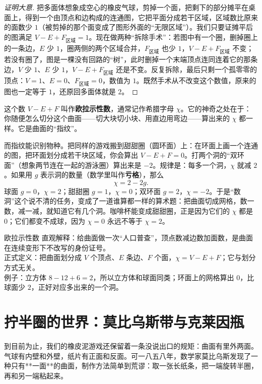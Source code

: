 \begin{proof}[证明大意]
把多面体想象成空心的橡皮气球，剪掉一个面，把剩下的部分摊平在桌面上，得到一个由顶点和边构成的连通图，它把平面分成若干区域，区域数比原来的面数少 $1$（被剪掉的那个面变成了图形外面的“无限区域”）。我们只要证摊平后的图满足 $V-E+F_{\text{区域}}=1$。现在做两种“拆除手术”：若图中有一个圈，删掉圈上的一条边，$E$ 少 $1$，圈两侧的两个区域合并，$F_{\text{区域}}$ 也少 $1$，$V-E+F_{\text{区域}}$ 不变；若没有圈了，图是一棵没有回路的“树”，此时删掉一个末端顶点连同连着它的那条边，$V$ 少 $1$、$E$ 少 $1$，$V-E+F_{\text{区域}}$ 还是不变。反复拆除，最后只剩一个孤零零的顶点：$V=1$、$E=0$、$F_{\text{区域}}=0$，数值为 $1$。既然手术从不改变这个数值，原来的图也一定等于 $1$，还原回多面体就是 $2$。
\end{proof}

这个数 $V-E+F$ 叫作\textbf{欧拉示性数}，通常记作希腊字母 $\chi$。它的神奇之处在于：你随便怎么切分这个曲面——切大块切小块、用直边用弯边——算出来的 $\chi$ 都一样。它是曲面的“指纹”。

而指纹能识别物种。把同样的游戏搬到甜甜圈（圆环面）上：在环面上画一个连通的图，把环面划分成若干块区域，你会算出 $V-E+F=0$。打两个洞的“双环面”（想象两节连在一起的游泳圈）算出来是 $-2$。规律是：每多一个洞，$\chi$ 就减 $2$。如果用 $g$ 表示洞的数量（数学里叫作\textbf{亏格}），那么
\[
\chi = 2 - 2g.
\]
球面 $g=0$，$\chi=2$；甜甜圈 $g=1$，$\chi=0$；双环面 $g=2$，$\chi=-2$。于是“数洞”这个说不清的任务，变成了一道谁算都一样的算术题：把曲面切成网格，数一数，减一减，就知道它有几个洞。咖啡杯能变成甜甜圈，正是因为它们的 $\chi$ 都是 $0$；它们都变不成球，因为 $\chi=0$ 永远不等于 $\chi=2$。

\begin{shuyu}{欧拉示性数}
直观解释：给曲面做一次“人口普查”，顶点数减边数加面数，是曲面在连续变形下不改写的身份证号。\\
正式定义：把曲面划分成 $V$ 个顶点、$E$ 条边、$F$ 个面，$\chi = V - E + F$；它与划分方式无关。\\
例子：立方体 $8-12+6=2$，所以立方体和球面同类；环面上的网格算出 $0$，比球面少 $2$，正好对应多出来的一个洞。
\end{shuyu}

\section{拧半圈的世界：莫比乌斯带与克莱因瓶}

到目前为止，我们的橡皮泥游戏还保留着一条没说出口的规矩：曲面有里外两面。气球有内壁和外壁，纸片有正面和反面。可一八五八年，数学家莫比乌斯发现了一种只有**一面**的曲面，制作方法简单到荒谬：取一张长纸条，把一端旋转半圈，再和另一端粘起来。

